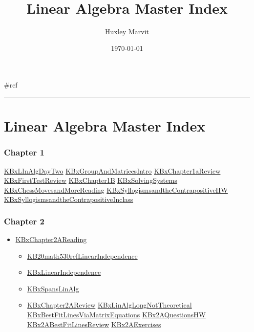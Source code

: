 \documentclass[letterpaper]{article}
\author{Huxley Marvit}
\date{\today}
\title{Linear Algebra Master Index}
\renewcommand{\tableofcontents}{}
\begin{document}
\tableofcontents

\#ref

\noindent\rule{\textwidth}{0.5pt}

\section{Linear Algebra Master Index}
\label{sec:org97b475e}
\subsubsection{Chapter 1}
\label{sec:org7161ac9}
\href{KBxLInAlgDayTwo.org}{KBxLInAlgDayTwo}
\href{KBxGroupAndMatricesIntro.org}{KBxGroupAndMatricesIntro}
\href{KBxChapter1aReview.org}{KBxChapter1aReview}
\href{KBxFirstTestReview.org}{KBxFirstTestReview}
\href{KBxChapter1B.org}{KBxChapter1B}
\href{KBxSolvingSystems.org}{KBxSolvingSystems}
\href{KBxChessMovesandMoreReading.org}{KBxChessMovesandMoreReading}
\href{KBxSyllogismsandtheContrapositiveHW.org}{KBxSyllogismsandtheContrapositiveHW}
\href{KBxSyllogismsandtheContrapositiveInclass.org}{KBxSyllogismsandtheContrapositiveInclass}

\subsubsection{Chapter 2}
\label{sec:org5804251}
\begin{itemize}
\item \href{KBxChapter2AReading.org}{KBxChapter2AReading}

\begin{itemize}
\item \href{KB20math530refLinearIndependence.org}{KB20math530refLinearIndependence}
\item \href{KBxLinearIndependence.org}{KBxLinearIndependence}
\item \href{KBxSpansLinAlg.org}{KBxSpansLinAlg}
\item \href{KBxChapter2AReview.org}{KBxChapter2AReview}
\href{KBxLinAlgLongNotTheoretical.org}{KBxLinAlgLongNotTheoretical}
\href{KBxBestFitLinesViaMatrixEquations.org}{KBxBestFitLinesViaMatrixEquations}
\href{KBx2AQuestionsHW.org}{KBx2AQuestionsHW}
\href{KBx2ABestFitLinesReview.org}{KBx2ABestFitLinesReview}
\href{KBx2AExercises.org}{KBx2AExercises}
\end{itemize}
\end{itemize}
\end{document}
